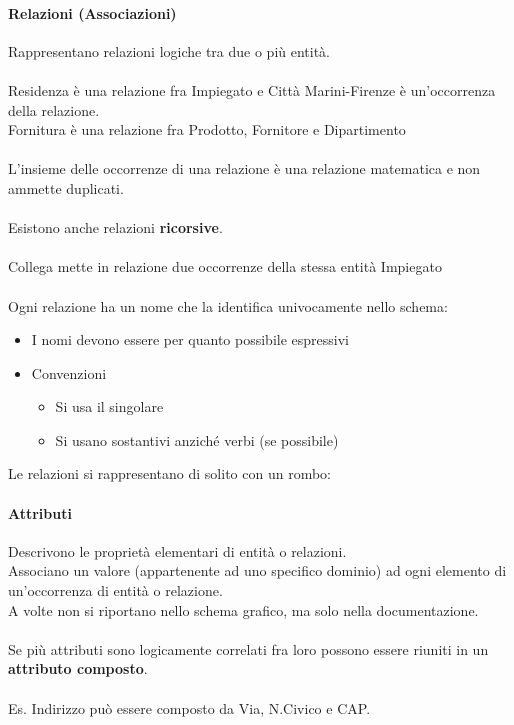\documentclass[../main.tex]{subfiles}
\begin{document}
	\paragraph{Relazioni (Associazioni)}
	Rappresentano relazioni logiche tra due o più entità.\\\\
	Residenza è una relazione fra Impiegato e Città Marini-Firenze è un’occorrenza della relazione.\\
	Fornitura è una relazione fra Prodotto, Fornitore e Dipartimento\\\\
	L’insieme delle occorrenze di una relazione è una relazione matematica e non ammette duplicati.\\\\
	Esistono anche relazioni \textbf{ricorsive}.\\\\
	Collega mette in relazione due occorrenze della stessa entità Impiegato\\\\
	Ogni relazione ha un nome che la identifica univocamente nello schema:
	\begin{itemize}
		\item I nomi devono essere per quanto possibile espressivi
		\item Convenzioni
		\begin{itemize}
			\item Si usa il singolare
			\item Si usano sostantivi anziché verbi (se possibile)
		\end{itemize}
	\end{itemize}
	Le relazioni si rappresentano di solito con un rombo:
	\begin{center}
	\end{center}
	\paragraph{Attributi}
	Descrivono le proprietà elementari di entità o relazioni.\\
	Associano un valore (appartenente ad uno specifico dominio) ad ogni elemento di un’occorrenza di entità o relazione.\\
	A volte non si riportano nello schema grafico, ma solo nella documentazione.\\\\
	Se più attributi sono logicamente correlati fra loro possono essere riuniti in un \textbf{attributo composto}.\\\\
	Es. Indirizzo può essere composto da Via, N.Civico e CAP.
\end{document}
